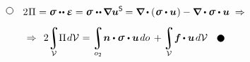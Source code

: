 \vspace{-0.55em}\begin{multline*}
\tikz[baseline=-1ex] \draw [line width=.5pt, color=black, fill=white] (0, 0) circle (.8ex);
\hspace{2.25ex}
2 \hspace{.1ex} \Pi \hspace{.1ex} = \linearstress \dotdotp \mathboldepsilon =
\linearstress \hspace{.1ex} \dotdotp \hspace{-0.12ex} \boldnabla \bm{u}^{\mathsf{S}} \hspace{-0.12ex} =
\boldnabla \hspace{-0.1ex} \dotp \left( \hspace{.1ex} \linearstress \dotp \bm{u} \hspace{.1ex} \right) -
\tikzmark{beginMinusLoad} \boldnabla \dotp \linearstress \tikzmark{endMinusLoad} \dotp \bm{u} \;\Rightarrow
\\[.5em]
%
\Rightarrow\;\,
\displaystyle 2 \hspace{-0.16em}
\integral\displaylimits_{\mathcal{V}} \hspace{-0.5ex} \Pi \hspace{0.2ex} d\mathcal{V} \hspace{.12ex} =
\integral\displaylimits_{o_2} \hspace{-0.4ex} \tikzmark{beginSurfaceLoad} \bm{n} \dotp \linearstress \tikzmark{endSurfaceLoad} \hspace{.1ex} \dotp \bm{u} \hspace{.25ex} do \hspace{.4ex} +
\integral\displaylimits_{\mathcal{V}} \hspace{-0.4ex} \bm{f} \hspace{-0.1ex} \dotp \bm{u} \hspace{.25ex} d\mathcal{V}
\hspace{2.25ex}
\tikz[baseline=-0.6ex] \draw [color=black, fill=black] (0, 0) circle (.8ex);
\end{multline*}%
%


